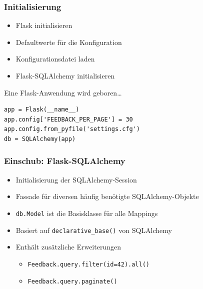 \documentclass{beamer}
\begin{document}
\begin{frame}[fragile]
  \frametitle{Initialisierung}
  \begin{itemize}
    \item Flask initialisieren
    \item Defaultwerte für die Konfiguration
    \item Konfigurationsdatei laden
    \item Flask-SQLAlchemy initialisieren
  \end{itemize}
  \begin{exampleblock}{Eine Flask-Anwendung wird geboren\ldots}
    \begin{lstlisting}
app = Flask(__name__)
app.config['FEEDBACK_PER_PAGE'] = 30
app.config.from_pyfile('settings.cfg')
db = SQLAlchemy(app)
    \end{lstlisting}
  \end{exampleblock}
\end{frame}

\begin{frame}
  \frametitle{Einschub: Flask-SQLAlchemy}
  \begin{itemize}
    \item Initialisierung der SQLAlchemy-Session
    \item Fassade für diversen häufig benötigte SQLAlchemy-Objekte
    \item \lstinline{db.Model} ist die Basisklasse für alle Mappings
    \item Basiert auf \lstinline{declarative_base()} von SQLAlchemy
    \item Enthält zusätzliche Erweiterungen
      \begin{itemize}
        \item \lstinline{Feedback.query.filter(id=42).all()}
        \item \lstinline{Feedback.query.paginate()}
      \end{itemize}
  \end{itemize}
\end{frame}

\end{document}

